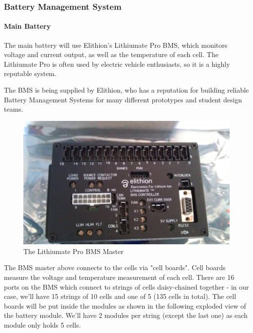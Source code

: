 \documentclass[main.tex]{subfiles}
\begin{document}
    \subsubsection{Battery Management System}
    \paragraph{Main Battery}
   	The main battery will use Elithion's Lithiumate Pro BMS, which monitors voltage and current output, as well as the temperature of each cell. The Lithiumate Pro is often used by electric vehicle enthusiasts, so it is a highly reputable system. 
    
    The BMS is being supplied by Elithion, who has a reputation for building reliable Battery Management Systems for many different prototypes and student design teams.
    

     \begin{figure}[H]
        \centering
        \includegraphics[width=\linewidth]{images/lithiumate_pro}
        \caption{The Lithiumate Pro BMS Master}
        \label{fig:bms-master}
    \end{figure}   
 
 	The BMS master above connects to the cells via "cell boards".  Cell boards measure the voltage and temperature measurement of each cell. There are 16 ports on the BMS which connect to strings of cells daisy-chained together - in our case, we'll have 15 strings of 10 cells and one of 5 (135 cells in total). The cell boards will be put inside the modules as shown in the following exploded view of the battery module. We'll have 2 modules per string (except the last one) as each module only holds 5 cells.
     
\end{document}
